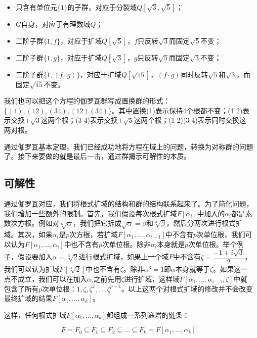 \documentclass[b5paper]{ctexart}
\begin{document}
\begin{itemize}
\item 只含有单位元$\{1\}$的子群，对应于分裂域$Q[\sqrt{3}, \sqrt{5}]$；
\item $G$自身，对应于有理数域$Q$；
\item 二阶子群$\{1, f\}$，对应于扩域$Q[\sqrt{5}]$，$f$只反转$\sqrt{3}$而固定$\sqrt{5}$不变；
\item 二阶子群$\{1, g\}$，对应于扩域$Q[\sqrt{3}]$，$g$只反转$\sqrt{5}$而固定$\sqrt{3}$不变；
\item 二阶子群$\{1, (f \cdot g)\}$，对应于扩域$Q[\sqrt{15}]$，$(f \cdot g)$同时反转$\sqrt{5}$和$\sqrt{3}$，而固定$\sqrt{15}$不变。
\end{itemize}

我们也可以把这个方程的伽罗瓦群写成置换群的形式：$\{(1), (1 2), (3 4), (1 2)(3 4)\}$。其中置换(1)表示保持4个根都不变；(1 2)表示交换$\pm \sqrt{3}$这两个根；(3 4)表示交换$\pm \sqrt{5}$这两个根；(1 2)(3 4)表示同时交换这两对根。

通过伽罗瓦基本定理，我们已经成功地将方程在域上的问题，转换为对称群的问题了。接下来要做的就是最后一击，通过群揭示可解性的本质。

\subsection{可解性}

通过伽罗瓦对应，我们将根式扩域的结构和群的结构联系起来了。为了简化问题，我们增加一些额外的限制。首先，我们假设每次根式扩域$F[\alpha_i]$中加入的$\alpha_i$都是素数次方根。例如对$\sqrt[6]{\alpha}$，我们把它拆成$\sqrt{\alpha} = \beta$和$\sqrt[3]{\beta}$，然后分两次进行根式扩域。其次，如果$\alpha_i$是$p$次方根，若扩域$F[\alpha_1, ..., \alpha_{i-1}]$中不含有$p$次单位根，我们可以认为$F[\alpha_1, ..., \alpha_i]$中也不含有$p$次单位根。除非$\alpha_i$本身就是$p$次单位根。举个例子，假设要加入$\alpha = \sqrt[3]{2}$进行根式扩域，如果上一个域$F$中不含有$\zeta = \dfrac{-1 + i\sqrt{3}}{2}$，我们可以认为扩域$F[\sqrt[3]{2}]$中也不含有$\zeta$。除非$\alpha^3 = 1$即$\alpha$本身就等于$\zeta$。如果这一点不成立，我们可以在加入$\alpha_i$之前先用$\zeta$进行扩域，这样域$F[\alpha_1, ..., \alpha_{i-1}, \zeta]$中就包含了所有$p$次单位根：$1, \zeta, \zeta^2, ..., \zeta^{p-1}$。以上这两个对根式扩域的修改并不会改变最终扩域的结果$F[\alpha_1, ..., \alpha_k]$。

这样，任何根式扩域$F[\alpha_1, ..., \alpha_k]$都组成一系列递增的链条：

\[
F = F_0 \subseteq F_1 \subseteq F_2 \subseteq ... \subseteq F_k = F[\alpha_1, ..., \alpha_k]
\]
\end{document}
